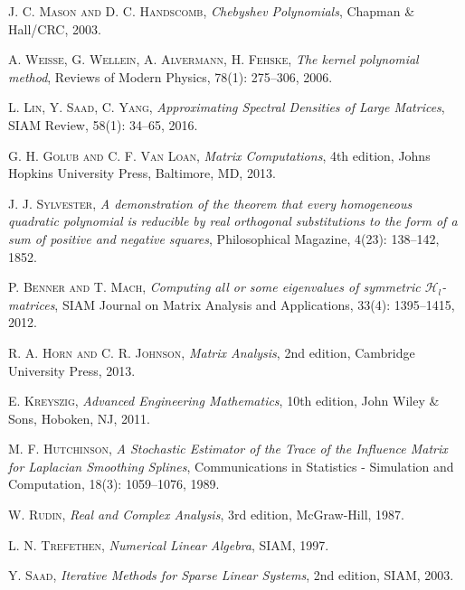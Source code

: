 \begin{thebibliography}{56}
    \textsc{J. C. Mason and D. C. Handscomb},
    \textit{Chebyshev Polynomials},
    Chapman \& Hall/CRC,
    2003.

    \textsc{A. Weisse, G. Wellein, A. Alvermann, H. Fehske},
    \textit{The kernel polynomial method},
    Reviews of Modern Physics, 78(1): 275--306,
    2006.

    \textsc{L. Lin, Y. Saad, C. Yang},
    \textit{Approximating Spectral Densities of Large Matrices},
    SIAM Review, 58(1): 34--65,
    2016.

    \textsc{G. H. Golub and C. F. Van Loan},
    \textit{Matrix Computations},
    4th edition,
    Johns Hopkins University Press,
    Baltimore, MD,
    2013.

    \textsc{J. J. Sylvester},
    \textit{A demonstration of the theorem that every homogeneous quadratic polynomial is reducible by real orthogonal substitutions to the form of a sum of positive and negative squares},
    Philosophical Magazine, 4(23): 138--142,
    1852.

    \textsc{P. Benner and T. Mach},
    \textit{Computing all or some eigenvalues of symmetric \textnormal{$\mathcal{H}_l$}-matrices},
    SIAM Journal on Matrix Analysis and Applications, 33(4): 1395--1415,
    2012.

    \textsc{R. A. Horn and C. R. Johnson},
    \textit{Matrix Analysis},
    2nd edition,
    Cambridge University Press,
    2013.

    \textsc{E. Kreyszig},
    \textit{Advanced Engineering Mathematics},
    10th edition,
    John Wiley \& Sons,
    Hoboken, NJ,
    2011.

    \textsc{M. F. Hutchinson},
    \textit{A Stochastic Estimator of the Trace of the Influence Matrix for Laplacian Smoothing Splines},
    Communications in Statistics - Simulation and Computation, 18(3): 1059--1076,
    1989.

    \textsc{W. Rudin},
    \textit{Real and Complex Analysis},
    3rd edition,
    McGraw-Hill,
    1987.

    \textsc{L. N. Trefethen},
    \textit{Numerical Linear Algebra},
    SIAM,
    1997.

    \textsc{Y. Saad},
    \textit{Iterative Methods for Sparse Linear Systems},
    2nd edition,
    SIAM,
    2003.


\end{thebibliography}
